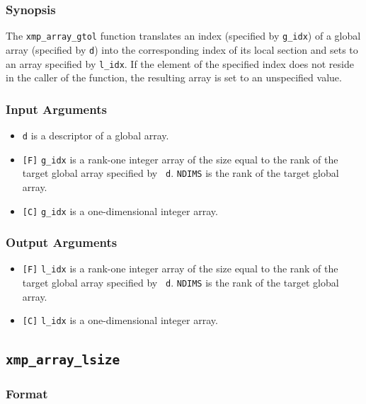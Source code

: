 \subsubsection*{Synopsis}

The {\tt xmp\_array\_gtol} function translates an index (specified by
{\tt g\_idx}) of a global array (specified by {\tt d}) into the
corresponding index of its local section and sets to an array specified
by {\tt l\_idx}. If the element of the specified index does not reside
in the caller of the function, the resulting array is set to an
unspecified value.

\subsubsection*{Input Arguments}

\begin{itemize}
 \item {\tt d} is a descriptor of a global array.
 \item \verb![F]! {\tt g\_idx} is a rank-one integer array of the size
       equal to the rank of the target global array specified by {\tt
       d}. {\tt NDIMS} is the rank of the target global array.
 \item \verb![C]! {\tt g\_idx} is a one-dimensional integer array.
\end{itemize}

\subsubsection*{Output Arguments}

\begin{itemize}
 \item \verb![F]! {\tt l\_idx} is a rank-one integer array of the size
       equal to the rank of the target global array specified by {\tt
       d}. {\tt NDIMS} is the rank of the target global array.
 \item \verb![C]! {\tt l\_idx} is a one-dimensional integer array.
\end{itemize}

\subsection{\tt xmp\_array\_lsize}

\subsubsection*{Format}


